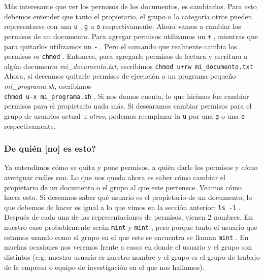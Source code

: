 \documentclass[10pt,letterpaper]{article}
\newcommand{\inlinecode}[1]{
\colorbox{light-gray}{\texttt{#1}}
}
\begin{document}
M\'as interesante que ver los permisos de los documentos, es cambiarlos. Para esto debemos entender que tanto el propietario, el grupo o la categor\'ia otros pueden representarse con una \inlinecode{u}, \inlinecode{g} u \inlinecode{o} respectivamente. Ahora vamos a cambiar los permisos de un documento. Para agregar permisos utilizamos un \inlinecode{+}, mientras que para quitarlos utilizamos un \inlinecode{-}. Pero el comando que realmente cambia los permisos es \inlinecode{chmod}. Entonces, para agregarle permisos de lectura y escritura a alg\'un documento \textit{mi\_documento.txt}, escribimos \inlinecode{chmod u+rw mi\_documento.txt} Ahora, si deseamos quitarle permisos de ejecuci\'on a un programa peque\~no \textit{mi\_programa.sh}, escribimos\\
\inlinecode{chmod u-x mi\_programa.sh}. Si nos damos cuenta, lo que hicimos fue cambiar permisos para el propietario nada m\'as. Si desearamos cambiar permisos para el grupo de usuarios actual u \emph{otros}, podemos reemplazar la \inlinecode{u} por una \inlinecode{g} o una \inlinecode{o} respectivamente.

\subsubsection{De qui\'en [no] es esto?}

Ya entendimos c\'omo se quita y pone permisos, a qui\'en darle los permisos y c\'omo averiguar cu\'ales son. Lo que nos queda ahora es saber c\'omo cambiar el propietario de un documento o el grupo al que este pertenece. Veamos c\'omo hacer esto. Si deseamos saber qu\'e usuario es el propietario de un documento, lo que debemos de hacer es igual a lo que vimos en la secci\'on anterior: \inlinecode{ls -l}. Despu\'es de cada una de las representaciones de permisos, vienen 2 nombres. En nuestro caso probablemente ser\'an \inlinecode{mint} y \inlinecode{mint}, pero porque tanto el usuario que estamos usando como el grupo en el que este se encuentra se llaman \inlinecode{mint}. En muchas ocasiones nos veremos frente a casos en donde el usuario y el grupo son distintos (e.g. nuestro usuario es nuestro nombre y el grupo es el grupo de trabajo de la empresa o equipo de investigaci\'on en el que nos hallamos).\\
\end{document}
